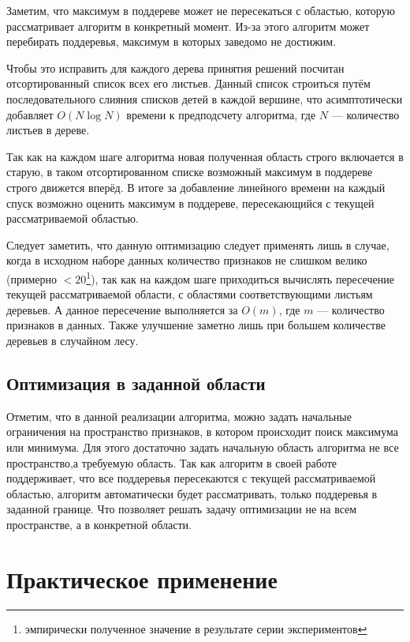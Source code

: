 Заметим, что максимум в поддереве может не пересекаться с областью, которую
рассматривает алгоритм в конкретный момент. Из-за этого алгоритм может
перебирать поддеревья, максимум в которых заведомо не достижим.

Чтобы это исправить для каждого дерева принятия решений посчитан отсортированный
список всех его листьев. Данный список строиться путём последовательного слияния
списков детей в каждой вершине, что асимптотически добавляет $O(N \log{N})$
времени к предподсчету алгоритма, где $N$ --- количество листьев в дереве.

Так как на каждом шаге алгоритма новая полученная область строго включается
в старую, в таком отсортированном списке возможный максимум в поддереве строго
движется вперёд. В итоге за добавление линейного времени на каждый спуск
возможно оценить максимум в поддереве, пересекающийся с текущей рассматриваемой
областью.

Следует заметить, что данную оптимизацию следует применять лишь в случае, когда
в исходном наборе данных количество признаков не слишком велико (примерно
$<20$\footnote{эмпирически полученное значение в результате серии
экспериментов}), так как на каждом шаге приходиться вычислять пересечение
текущей рассматриваемой области, с областями соответствующими листьям деревьев.
А данное пересечение выполняется за $O(m)$, где $m$ --- количество признаков
в данных. Также улучшение заметно лишь при большем количестве деревьев
в случайном лесу.

\subsection{Оптимизация в заданной области}

Отметим, что в данной реализации алгоритма, можно задать начальные ограничения
на пространство признаков, в котором происходит поиск максимума или минимума.
Для этого достаточно задать начальную область алгоритма не все пространство,а
требуемую область. Так как алгоритм в своей работе поддерживает, что все
поддеревья пересекаются с текущей рассматриваемой областью, алгоритм
автоматически будет рассматривать, только поддеревья в заданной границе. Что
позволяет решать задачу оптимизации не на всем пространстве, а в конкретной
области.

\section{Практическое применение}\label{sec:smac}

